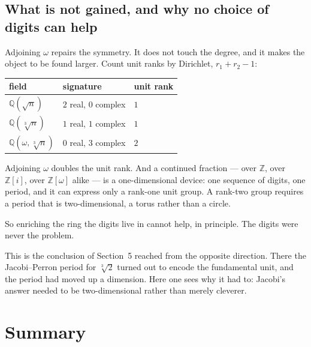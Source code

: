 \documentclass[12pt,a4paper]{article}
\theoremstyle{plain}
\theoremstyle{definition}
\begin{document}
\subsection*{What is not gained, and why no choice of digits can help}

Adjoining $\omega$ repairs the symmetry. It does not touch the degree, and it makes the object to be found larger. Count unit ranks by Dirichlet, $r_1 + r_2 - 1$:

\begin{center}
\begin{tabular}{lll}
\toprule
field & signature & unit rank \\
\midrule
$\mathbb{Q}(\sqrt n)$            & $2$ real, $0$ complex & $1$ \\
$\mathbb{Q}(\sqrt[3]{n})$        & $1$ real, $1$ complex & $1$ \\
$\mathbb{Q}(\omega,\sqrt[3]{n})$ & $0$ real, $3$ complex & $2$ \\
\bottomrule
\end{tabular}
\end{center}

\begin{tcolorbox}[colback=blue!6, colframe=blue!45!black, arc=2mm]
Adjoining $\omega$ doubles the unit rank. And a continued fraction --- over $\mathbb{Z}$, over $\mathbb{Z}[i]$, over $\mathbb{Z}[\omega]$ alike --- is a one-dimensional device: one sequence of digits, one period, and it can express only a rank-one unit group. A rank-two group requires a period that is two-dimensional, a torus rather than a circle.

So enriching the ring the digits live in cannot help, in principle. The digits were never the problem.
\end{tcolorbox}

This is the conclusion of Section~5 reached from the opposite direction. There the Jacobi--Perron period for $\sqrt[3]{2}$ turned out to encode the fundamental unit, and the period had moved up a dimension. Here one sees why it had to: Jacobi's answer needed to be two-dimensional rather than merely cleverer.

\section{Summary}
\end{document}
